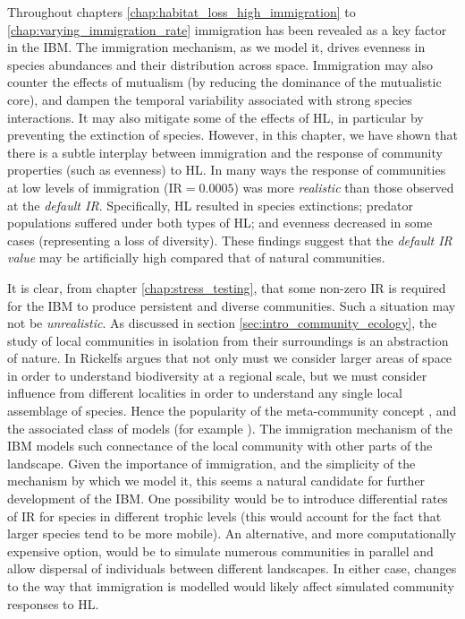 Throughout chapters \ref{chap:habitat_loss_high_immigration} to \ref{chap:varying_immigration_rate} immigration has been revealed as a key factor in the IBM. The immigration mechanism, as we model it, drives evenness in species abundances and their distribution across space. Immigration may also counter the effects of mutualism (by reducing the dominance of the mutualistic core), and dampen the temporal variability associated with strong species interactions. It may also mitigate some of the effects of HL, in particular by preventing the extinction of species. However, in this chapter, we have shown that there is a subtle interplay between immigration and the response of community properties (such as evenness) to HL. In many ways the response of communities at low levels of immigration (IR$=0.0005$) was more \emph{realistic} than those observed at the \emph{default IR}. Specifically, HL resulted in species extinctions; predator populations suffered under both types of HL; and evenness decreased in some cases (representing a loss of diversity). These findings suggest that the \emph{default IR value} may be artificially high compared that of natural communities. 

It is clear, from chapter \ref{chap:stress_testing}, that some non-zero IR is required for the IBM to produce persistent and diverse communities. Such a situation may not be \emph{unrealistic}. As discussed in section \ref{sec:intro_community_ecology}, the study of local communities in isolation from their surroundings is an abstraction of nature. In \cite{ricklefs2008disintegration} Rickelfs argues that not only must we consider larger areas of space in order to understand biodiversity at a regional scale, but we must consider influence from different localities in order to understand any single local assemblage of species. Hence the popularity of the meta-community concept \cite{leibold2004metacommunity}, and the associated class of models (for example \cite{ovaskainen2002metapopulation}). The immigration mechanism of the IBM models such connectance of the local community with other parts of the landscape. Given the importance of immigration, and the simplicity of the mechanism by which we model it, this seems a natural candidate for further development of the IBM. One possibility would be to introduce differential rates of IR for species in different trophic levels (this would account for the fact that larger species tend to be more mobile). An alternative, and more computationally expensive option, would be to simulate numerous communities in parallel and allow dispersal of individuals between different landscapes. In either case, changes to the way that immigration is modelled would likely affect simulated community responses to HL. 

